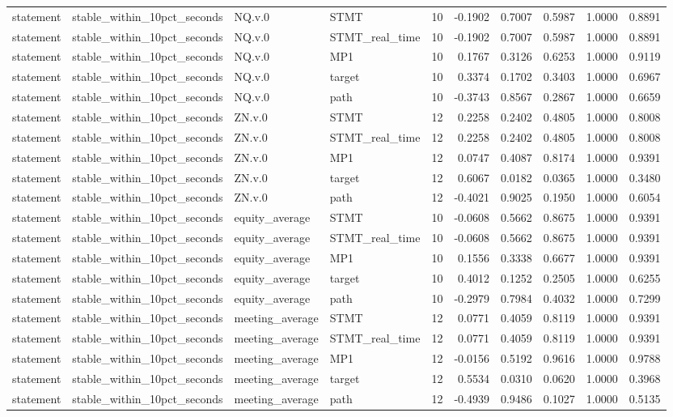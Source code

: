 \begin{tabular}{llllrrrrrr}
statement & stable_within_10pct_seconds & NQ.v.0 & STMT & 10 & -0.1902 & 0.7007 & 0.5987 & 1.0000 & 0.8891 \\
statement & stable_within_10pct_seconds & NQ.v.0 & STMT_real_time & 10 & -0.1902 & 0.7007 & 0.5987 & 1.0000 & 0.8891 \\
statement & stable_within_10pct_seconds & NQ.v.0 & MP1 & 10 & 0.1767 & 0.3126 & 0.6253 & 1.0000 & 0.9119 \\
statement & stable_within_10pct_seconds & NQ.v.0 & target & 10 & 0.3374 & 0.1702 & 0.3403 & 1.0000 & 0.6967 \\
statement & stable_within_10pct_seconds & NQ.v.0 & path & 10 & -0.3743 & 0.8567 & 0.2867 & 1.0000 & 0.6659 \\
statement & stable_within_10pct_seconds & ZN.v.0 & STMT & 12 & 0.2258 & 0.2402 & 0.4805 & 1.0000 & 0.8008 \\
statement & stable_within_10pct_seconds & ZN.v.0 & STMT_real_time & 12 & 0.2258 & 0.2402 & 0.4805 & 1.0000 & 0.8008 \\
statement & stable_within_10pct_seconds & ZN.v.0 & MP1 & 12 & 0.0747 & 0.4087 & 0.8174 & 1.0000 & 0.9391 \\
statement & stable_within_10pct_seconds & ZN.v.0 & target & 12 & 0.6067 & 0.0182 & 0.0365 & 1.0000 & 0.3480 \\
statement & stable_within_10pct_seconds & ZN.v.0 & path & 12 & -0.4021 & 0.9025 & 0.1950 & 1.0000 & 0.6054 \\
statement & stable_within_10pct_seconds & equity_average & STMT & 10 & -0.0608 & 0.5662 & 0.8675 & 1.0000 & 0.9391 \\
statement & stable_within_10pct_seconds & equity_average & STMT_real_time & 10 & -0.0608 & 0.5662 & 0.8675 & 1.0000 & 0.9391 \\
statement & stable_within_10pct_seconds & equity_average & MP1 & 10 & 0.1556 & 0.3338 & 0.6677 & 1.0000 & 0.9391 \\
statement & stable_within_10pct_seconds & equity_average & target & 10 & 0.4012 & 0.1252 & 0.2505 & 1.0000 & 0.6255 \\
statement & stable_within_10pct_seconds & equity_average & path & 10 & -0.2979 & 0.7984 & 0.4032 & 1.0000 & 0.7299 \\
statement & stable_within_10pct_seconds & meeting_average & STMT & 12 & 0.0771 & 0.4059 & 0.8119 & 1.0000 & 0.9391 \\
statement & stable_within_10pct_seconds & meeting_average & STMT_real_time & 12 & 0.0771 & 0.4059 & 0.8119 & 1.0000 & 0.9391 \\
statement & stable_within_10pct_seconds & meeting_average & MP1 & 12 & -0.0156 & 0.5192 & 0.9616 & 1.0000 & 0.9788 \\
statement & stable_within_10pct_seconds & meeting_average & target & 12 & 0.5534 & 0.0310 & 0.0620 & 1.0000 & 0.3968 \\
statement & stable_within_10pct_seconds & meeting_average & path & 12 & -0.4939 & 0.9486 & 0.1027 & 1.0000 & 0.5135 \\
\bottomrule
\end{tabular}

